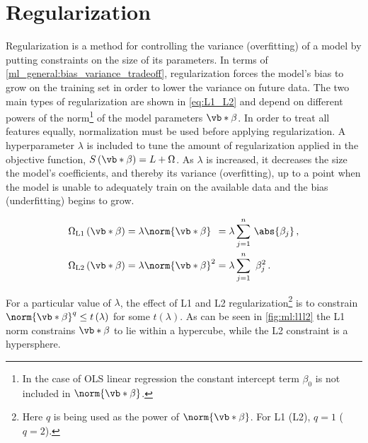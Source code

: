 \section{Regularization}
\label{ml_general:reg}

Regularization is a method for controlling the variance (overfitting)
of a model by putting constraints on the size of its parameters.
In terms of \cref{ml_general:bias_variance_tradeoff}, regularization forces the model's
bias to grow on the training set in order to lower the variance on future data.
The two main types of regularization are shown in \cref{eq:L1_L2}
and depend on different powers of the norm\footnote{In
the case of OLS linear regression the constant intercept term $\beta_{0}$ is not included in $\norm{\vb*{\beta}}$.} of the model parameters $\vb*{\beta}$.
In order to treat all features equally, normalization must be used before applying regularization.
A hyperparameter $\lambda$ is included to tune the amount of regularization applied in the objective function,
$S\left(\vb*{\beta}\right) = L + \Omega$.
As $\lambda$ is increased, it decreases the size the model's coefficients, and thereby its variance (overfitting),
up to a point when the model is unable to adequately train on the available data and the bias (underfitting) begins to grow.

\begin{subequations} \label{eq:L1_L2}
\begin{align}
\Omega_{\text{L1}}\left(\vb*{\beta}\right) &= \lambda \norm{\vb*{\beta}}\hphantom{^{1}}
= \lambda \sum_{j=1}^{n} \, \abs{\beta_{j}}\,, \label{eq:L1} \\
\Omega_{\text{L2}}\left(\vb*{\beta}\right) &= \lambda \norm{\vb*{\beta}}^{2}
= \lambda \sum_{j=1}^{n} \,\, \beta_{j}^{2}\,. \label{eq:L2}
\end{align}
\end{subequations}

For a particular value of $\lambda$, the effect of L1 and L2 regularization\footnote{Here
$q$ is being used as the power of $\norm{\vb*{\beta}}$. For L1 (L2), $q=1$ ($q=2$).} is
to constrain $\norm{\vb*{\beta}}^{q} \leq t\left(\lambda\right)$ for some $t\left(\lambda\right)$.
As can be seen in \cref{fig:ml:l1l2} the L1 norm constrains $\vb*{\beta}$ to lie within a hypercube,
while the L2 constraint is a hypersphere.


